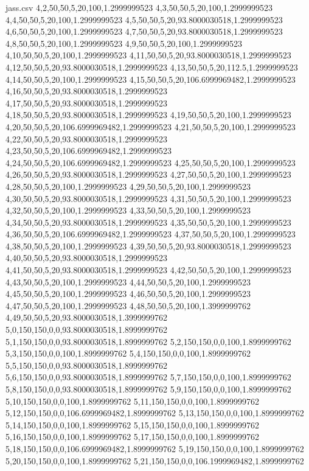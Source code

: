 \begin{filecontents*}{jass.csv}
4,2,50,50,5,20,100,1.2999999523
4,3,50,50,5,20,100,1.2999999523
4,4,50,50,5,20,100,1.2999999523
4,5,50,50,5,20,93.8000030518,1.2999999523
4,6,50,50,5,20,100,1.2999999523
4,7,50,50,5,20,93.8000030518,1.2999999523
4,8,50,50,5,20,100,1.2999999523
4,9,50,50,5,20,100,1.2999999523
4,10,50,50,5,20,100,1.2999999523
4,11,50,50,5,20,93.8000030518,1.2999999523
4,12,50,50,5,20,93.8000030518,1.2999999523
4,13,50,50,5,20,112.5,1.2999999523
4,14,50,50,5,20,100,1.2999999523
4,15,50,50,5,20,106.6999969482,1.2999999523
4,16,50,50,5,20,93.8000030518,1.2999999523
4,17,50,50,5,20,93.8000030518,1.2999999523
4,18,50,50,5,20,93.8000030518,1.2999999523
4,19,50,50,5,20,100,1.2999999523
4,20,50,50,5,20,106.6999969482,1.2999999523
4,21,50,50,5,20,100,1.2999999523
4,22,50,50,5,20,93.8000030518,1.2999999523
4,23,50,50,5,20,106.6999969482,1.2999999523
4,24,50,50,5,20,106.6999969482,1.2999999523
4,25,50,50,5,20,100,1.2999999523
4,26,50,50,5,20,93.8000030518,1.2999999523
4,27,50,50,5,20,100,1.2999999523
4,28,50,50,5,20,100,1.2999999523
4,29,50,50,5,20,100,1.2999999523
4,30,50,50,5,20,93.8000030518,1.2999999523
4,31,50,50,5,20,100,1.2999999523
4,32,50,50,5,20,100,1.2999999523
4,33,50,50,5,20,100,1.2999999523
4,34,50,50,5,20,93.8000030518,1.2999999523
4,35,50,50,5,20,100,1.2999999523
4,36,50,50,5,20,106.6999969482,1.2999999523
4,37,50,50,5,20,100,1.2999999523
4,38,50,50,5,20,100,1.2999999523
4,39,50,50,5,20,93.8000030518,1.2999999523
4,40,50,50,5,20,93.8000030518,1.2999999523
4,41,50,50,5,20,93.8000030518,1.2999999523
4,42,50,50,5,20,100,1.2999999523
4,43,50,50,5,20,100,1.2999999523
4,44,50,50,5,20,100,1.2999999523
4,45,50,50,5,20,100,1.2999999523
4,46,50,50,5,20,100,1.2999999523
4,47,50,50,5,20,100,1.2999999523
4,48,50,50,5,20,100,1.3999999762
4,49,50,50,5,20,93.8000030518,1.3999999762
5,0,150,150,0,0,93.8000030518,1.8999999762
5,1,150,150,0,0,93.8000030518,1.8999999762
5,2,150,150,0,0,100,1.8999999762
5,3,150,150,0,0,100,1.8999999762
5,4,150,150,0,0,100,1.8999999762
5,5,150,150,0,0,93.8000030518,1.8999999762
5,6,150,150,0,0,93.8000030518,1.8999999762
5,7,150,150,0,0,100,1.8999999762
5,8,150,150,0,0,93.8000030518,1.8999999762
5,9,150,150,0,0,100,1.8999999762
5,10,150,150,0,0,100,1.8999999762
5,11,150,150,0,0,100,1.8999999762
5,12,150,150,0,0,106.6999969482,1.8999999762
5,13,150,150,0,0,100,1.8999999762
5,14,150,150,0,0,100,1.8999999762
5,15,150,150,0,0,100,1.8999999762
5,16,150,150,0,0,100,1.8999999762
5,17,150,150,0,0,100,1.8999999762
5,18,150,150,0,0,106.6999969482,1.8999999762
5,19,150,150,0,0,100,1.8999999762
5,20,150,150,0,0,100,1.8999999762
5,21,150,150,0,0,106.1999969482,1.8999999762

\end{filecontents*}
